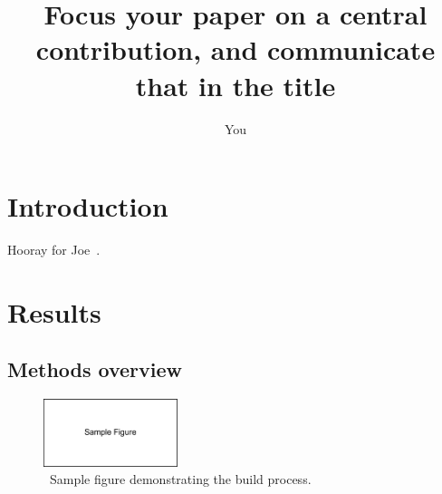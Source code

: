 \documentclass{article}
\title{Focus your paper on a central contribution, and communicate that in the title}
\author{You}
\begin{document}
\maketitle

\begin{abstract}
\end{abstract}


\section*{Introduction}







Hooray for Joe~\cite{Felsenstein1981-zs}.

\section*{Results}

\subsection*{Methods overview}

\begin{figure}[h]
\centering
\includegraphics[width=0.35\textwidth]{figures/sample-figure.pdf}
\caption{\
Sample figure demonstrating the build process.
}%
\label{fig:sample}
\end{figure}
\end{document}
